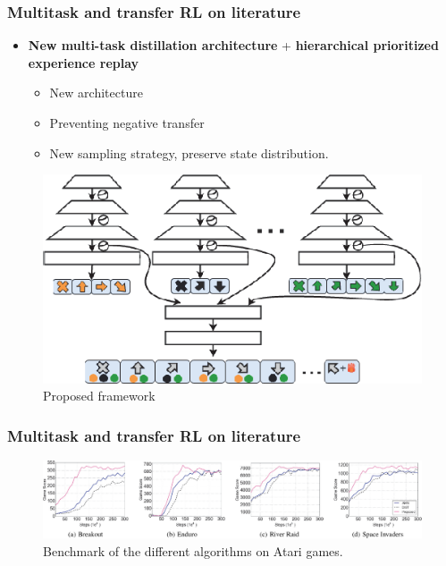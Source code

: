 \documentclass{beamer}
\theoremstyle{remark}
\theoremstyle{plain}
\begin{document}
\begin{frame}
  \frametitle{Multitask and transfer RL on literature}
\begin{itemize}
    \item \textbf{New multi-task distillation architecture} + \textbf{hierarchical prioritized experience replay} \cite{YinKnowledgeReplay}
    \begin{itemize}
        \item New architecture
        \item Preventing negative transfer
        \item New sampling strategy, preserve state distribution.
    \end{itemize} 
\end{itemize}
\begin{figure}
    \centering
    \includegraphics[scale=0.3]{figs/transfer.png}
    \caption{Proposed framework}
    \label{fig:my_label}
\end{figure}
 \end{frame}
 
\begin{frame}
  \frametitle{Multitask and transfer RL on literature} 
  \begin{figure}
      \centering
      \includegraphics[scale=0.24]{figs/comparison.png}
      \caption{Benchmark of the different algorithms on Atari games.}
      \label{fig:my_label}
  \end{figure}
\end{frame}
 
\end{document}
